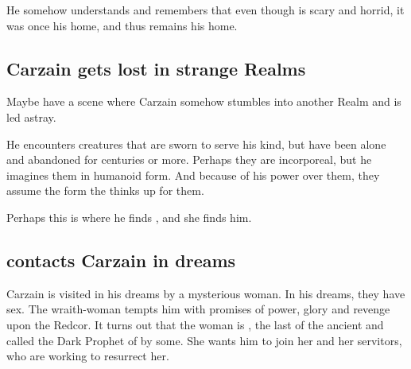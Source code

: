 
He somehow understands and remembers that even though \Nyx{} is scary and horrid, it was once his home, and thus remains his home. 










\subsection{Carzain gets lost in strange Realms}
Maybe have a scene where Carzain somehow stumbles into another Realm and is led astray. 

He encounters creatures that are sworn to serve his kind, but have been alone and abandoned for centuries or more. Perhaps they are incorporeal, but he imagines them in humanoid form. And because of his power over them, they assume the form the thinks up for them.

Perhaps this is where he finds \Belzir, and she finds him.







\subsection{\Belzir contacts Carzain in dreams}
Carzain is visited in his dreams by a mysterious woman. In his dreams, they have sex. The wraith-woman tempts him with promises of power, glory and revenge upon the Redcor. It turns out that the woman is \Belzir, the last \Calipha of the ancient \VaimonCaliphate and called the Dark Prophet of \itzach by some. She wants him to join her and her servitors, who are working to resurrect her. 


